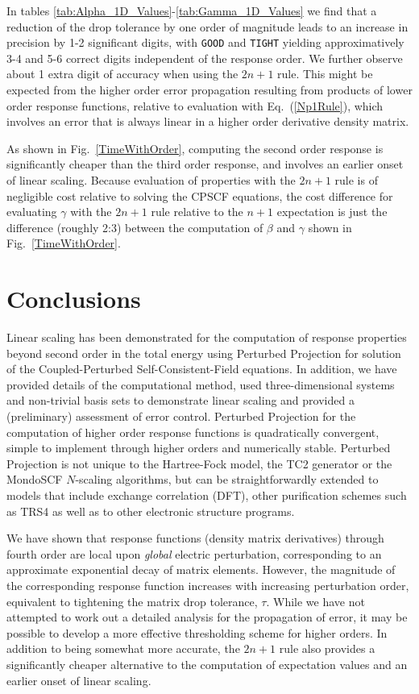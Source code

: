 \documentclass[prl,twocolumn,showpacs,twocolumngrid,superbib]{revtex4}
\begin{document}
In tables \ref{tab:Alpha_1D_Values}-\ref{tab:Gamma_1D_Values} we find that 
a reduction of the drop tolerance by one order of magnitude leads to an increase in precision by
1-2 significant digits, with {\tt GOOD} and {\tt TIGHT} yielding approximatively 3-4 and 5-6 
correct digits  independent of the response order.  We further observe about 1 extra digit of accuracy 
when using the $2n+1$ rule.  This might be expected from the higher order error propagation resulting from 
products of lower order response functions, relative to evaluation with  Eq.~(\ref{Np1Rule}), 
which involves an error that is always linear in a higher order derivative density matrix.  

As shown in Fig.~\ref{TimeWithOrder}, computing the second order response is significantly cheaper 
than the third order response, and involves an earlier onset of linear scaling. Because evaluation 
of properties with the $2 n+1$ rule is of negligible cost relative to solving the CPSCF equations, the cost 
difference for evaluating $\gamma$ with the $2 n+1$ rule relative to the $n+1$ expectation is just the 
difference (roughly 2:3) between the computation of $\beta$ and $\gamma$ shown in Fig.~\ref{TimeWithOrder}.

\section{Conclusions}

Linear scaling has been demonstrated for the computation of response properties beyond second
order in the total energy using Perturbed Projection for solution of the 
Coupled-Perturbed Self-Consistent-Field equations.
In addition, we have provided details of 
the computational method, used three-dimensional systems and non-trivial basis sets
to demonstrate linear scaling and provided a (preliminary) assessment of 
error control.  Perturbed Projection for the 
computation of higher order response functions is quadratically convergent, simple 
to implement through higher orders and numerically stable.  Perturbed Projection is 
not unique to the Hartree-Fock model, the TC2 generator or the {\sc MondoSCF} 
$N$-scaling algorithms, but can be straightforwardly extended to models that include 
exchange correlation (DFT), other purification schemes such as TRS4 \cite{ANiklasson03}
as well as to  other electronic structure programs.  

We have shown that response functions (density matrix derivatives) through fourth 
order are local upon {\em global} electric perturbation, corresponding to an 
approximate exponential decay of matrix elements.  However, the magnitude of the 
corresponding response function increases with increasing perturbation order, equivalent 
to tightening the matrix drop tolerance, $\tau$.   While we have not attempted to 
work out a detailed analysis for the propagation of error, it may be possible 
to develop a more effective thresholding scheme for higher orders. In addition 
to being somewhat more accurate, the $2 n+1$ rule also provides a significantly 
cheaper alternative to the computation of expectation values and an earlier onset 
of linear scaling. 
\end{document}
